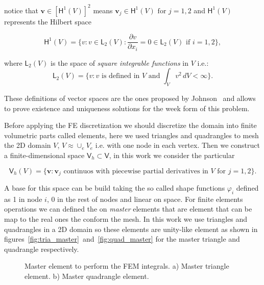 \documentclass[3p]{elsarticle}
\begin{document}
\noindent
notice that $\bm{v} \in \left[\bm{\mathsf{H}}^1(V)\right]^2$ means 
$\bm{v}_j \in \bm{\mathsf{H}}^1(V) \text{ for } j=1,2$ and $\bm{\mathsf{H}}^1(V) $ 
represents the Hilbert space

\begin{equation}
\bm{\mathsf{H}}^1(V) = \{ 
  v : v \in \bm{\mathsf{L}}_2(V): \frac{\partial v}{\partial x_i}=0 \in \bm{\mathsf{L}}_2(V)
  \text{ if } i=1,2 
\},
\end{equation}

\noindent
where $\bm{\mathsf{L}}_2(V)$ is the space of \emph{square integrable functions} in $V$
i.e.:
\begin{equation}
\bm{\mathsf{L}}_2(V) = \{ 
  v : v \text{ is defined in } V \text{ and } \int_V v^2 \, dV < \infty
\}.
\end{equation}

These definitions of vector spaces are the ones proposed by
Johnson~\cite{johnson-first} and allows to prove existence and uniqueness
solutions for the week form of this problem.

Before applying the FE discretization we should discretize the domain into finite
volumetric parts called elements, here we used triangles and quadrangles to mesh
the 2D domain $V$, $V \approx \cup_e V_e$ i.e. with one node in each vertex.
Then we construct a finite-dimensional space 
$\bm{\mathsf{V}}_h \subset \bm{\mathsf{V}}$, in this work we consider the
particular

\begin{equation}
\bm{\mathsf{V}}_h(V) = \{ 
  \bm{v} : \bm{v}_j \text{ continuos with piecewise partial derivatives in } V
  \text{ for } j=1,2
\}.
\end{equation}

A base for this space can be build taking the so called shape functions
$\varphi_i$ defined as 1 in node $i$, 0 in the rest of nodes and linear on
space. For finite elements operations we can defined the on \emph{master}
elements that are element that can be map to the real ones the conform the mesh.
In this work we use triangles and quadrangles in a 2D domain so these elements
are unity-like element as shown in
figures~\ref{fig:tria_master}~and~\ref{fig:quad_master} for the master triangle
and quadrangle respectively.


\begin{figure}[!ht]
\centering
\begin{minipage}[b]{0.4\linewidth}
\subcaptionbox{\label{fig:tria_master}}{
\resizebox{4.0cm}{!}{}}
\end{minipage}
\hspace{1.5cm}
\begin{minipage}[b]{0.4\linewidth}
\subcaptionbox{\label{fig:quad_master}}{
\resizebox{4.0cm}{!}{}}
\end{minipage}
\caption{Master element to perform the FEM integrals.
a) Master triangle element. 
b) Master quadrangle element.
}
\label{fig_dist_scheme}
\end{figure}
\end{document}
